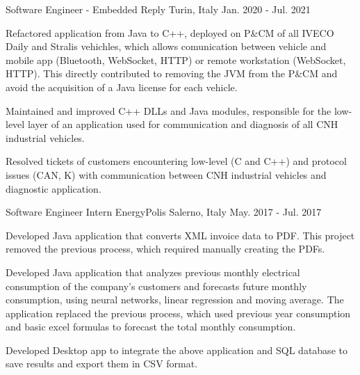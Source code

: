 \begin{cventries}
  \cventry
    {Software Engineer - Embedded} %
    {Reply} %
    {Turin, Italy} %
    {Jan. 2020 - Jul. 2021} %
    {
      \begin{cvitems} %
        \item {Refactored application from Java to C++, deployed on P\&CM of all IVECO Daily and Stralis vehichles, which allows comunication between vehicle and mobile app (Bluetooth, WebSocket, HTTP) or remote workstation (WebSocket, HTTP). This directly contributed to removing the JVM from the P\&CM and avoid the acquisition of a Java license for each vehicle.}
        \item {Maintained and improved C++ DLLs and Java modules, responsible for the low-level layer of an application used for communication and diagnosis of all CNH industrial vehicles.}
        \item {Resolved tickets of customers encountering low-level (C and C++) and protocol issues (CAN, K) with communication between CNH industrial vehicles and diagnostic application.}
      \end{cvitems}
    }
  \cventry
    {Software Engineer Intern} %
    {EnergyPolis} %
    {Salerno, Italy} %
    {May. 2017 - Jul. 2017} %
    {
      \begin{cvitems} %
        \item {Developed Java application that converts XML invoice data to PDF. This project removed the previous process, which required manually creating the PDFs.}
        \item {Developed Java application that analyzes previous monthly electrical consumption of the company's customers and forecasts future monthly consumption, using neural networks, linear regression and moving average. The application replaced the previous process, which used previous year consumption and basic excel formulas to forecast the total monthly consumption.}
        \item {Developed Desktop app to integrate the above application and SQL database to save results and export them in CSV format.}
      \end{cvitems}
    }
\end{cventries}
